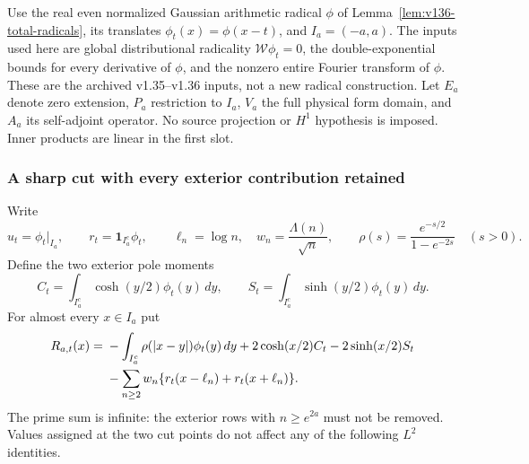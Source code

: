 \documentclass[11pt]{article}
\theoremstyle{remark}
\begin{document}
Use the real even normalized Gaussian arithmetic radical $\phi$ of
Lemma~\ref{lem:v136-total-radicals}, its translates
$\phi_t(x)=\phi(x-t)$, and $I_a=(-a,a)$. The inputs used here are
global distributional radicality $\mathcal W\phi_t=0$, the
double-exponential bounds for every derivative of $\phi$, and the
nonzero entire Fourier transform of $\phi$. These are the archived
v1.35--v1.36 inputs, not a new radical construction. Let $E_a$ denote
zero extension, $P_a$ restriction to $I_a$, $V_a$ the full physical
form domain, and $A_a$ its self-adjoint operator. No source projection
or $H^1$ hypothesis is imposed. Inner products are linear in the first slot.

\subsubsection{A sharp cut with every exterior contribution retained}

Write
\[
 u_t=\phi_t|_{I_a},\qquad r_t=\mathbf1_{I_a^c}\phi_t,
 \qquad \ell_n=\log n,\quad w_n=\frac{\Lambda(n)}{\sqrt n},
 \qquad \rho(s)=\frac{e^{-s/2}}{1-e^{-2s}}\quad(s>0).
\]
Define the two exterior pole moments
\[
 C_t=\int_{I_a^c}\cosh(y/2)\phi_t(y)\,dy,\qquad
 S_t=\int_{I_a^c}\sinh(y/2)\phi_t(y)\,dy.
\]
For almost every $x\in I_a$ put
\begin{align}
 R_{a,t}(x)={}&-\int_{I_a^c}\rho(|x-y|)\phi_t(y)\,dy
       +2\cosh(x/2)C_t-2\sinh(x/2)S_t\notag\\
 &-\sum_{n\ge2}w_n\{r_t(x-\ell_n)+r_t(x+\ell_n)\}.
 \label{eq:ns58-exterior-row}
\end{align}
The prime sum is infinite: the exterior rows with $n\ge e^{2a}$
must not be removed. Values assigned at the two cut points do not
affect any of the following $L^2$ identities.
\end{document}
